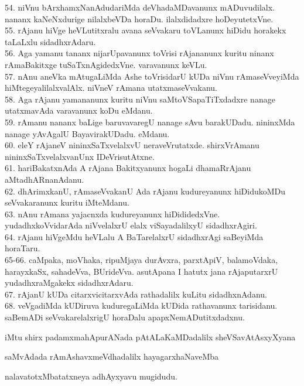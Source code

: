 \documentclass{article}
\begin{document}
54. niVnu bArxhamxNanAdudariMda deVhadaMDavanunx mADuvudilalx. nananx kaNeNxdurige nilalxbeVDa horaDu. ilalxdidadxre hoDeyutetxVne.\\
55. rAjanu hiVge heVLutitxralu avana seVvakaru toVLanunx hiDidu horakekx taLaLxlu sidadhxrAdaru.\\
56. Aga yamanu tananx nijarUpavanunx toVrisi rAjananunx kuritu ninanx rAmaBakitxge tuSaTxnAgidedxVne. varavanunx keVLu.\\
57. nAnu aneVka mAtugaLiMda Ashe toVrisidarU kUDa niVnu rAmaseVveyiMda hiMtegeyalilalxvalAlx. niVneV rAmana utatxmaseVvakanu.\\
58. Aga rAjanu yamananunx kuritu niVnu saMtoVSapaTiTxdadxre nanage utatxmavAda varavanunx koDu eMdanu.\\
59. rAmanu nananx baLige baruvavaregU nanage sAvu barakUDadu. nininxMda nanage yAvAgalU BayavirakUDadu. eMdanu.\\
60. eleY rAjaneV nininxSaTxvelalxvU neraveVrutatxde. shirxVrAmanu nininxSaTxvelalxvanUnx IDeVrisutAtxne.\\
61. hariBakatxnAda A rAjana Bakitxyanunx hogaLi dhamaRrAjanu aMtadhARnanAdanu.\\
62. dhArimxkanU, rAmaseVvakanU Ada rAjanu kudureyanunx hiDidukoMDu seVvakaranunx kuritu iMteMdanu.\\
63. nAnu rAmana yajacnxda kudureyanunx hiDididedxVne. yudadhxkoVvidarAda niVvelalxrU elalx viSayadalilxyU sidadhxrAgiri.\\
64. rAjanu hiVgeMdu heVLalu A BaTarelalxrU sidadhxrAgi saBeyiMda horaTaru.\\
65-66. caMpaka, moVhaka, ripuMjaya durAvxra, parxtApiV, balamoVdaka, harayxkaSx, sahadeVva, BUrideVva. asutApana I hatutx jana rAjaputarxrU yudadhxraMgakekx sidadhxrAdaru.\\
67. rAjanU kUDa citarxvicitarxvAda rathadalilx  kuLitu sidadhxnAdanu.\\
68. veVgadiMda kUDiruva kuduregaLiMda kUDida rathavanunx tarisidanu. saBemADi seVvakarelalxrigU horaDalu apapxNemADutitxdadxnu.

\begin{center}
iMtu shirx padamxmahApurANada pAtALaKaMDadalilx sheVSavAtAsxyXyana
\end{center}

\begin{center}
saMvAdada rAmAshavxmeVdhadalilx hayagarxhaNaveMba
\end{center}

\begin{center}
nalavatotxMbatatxneya adhAyxyavu mugidudu.
\end{center}
\end{document}
